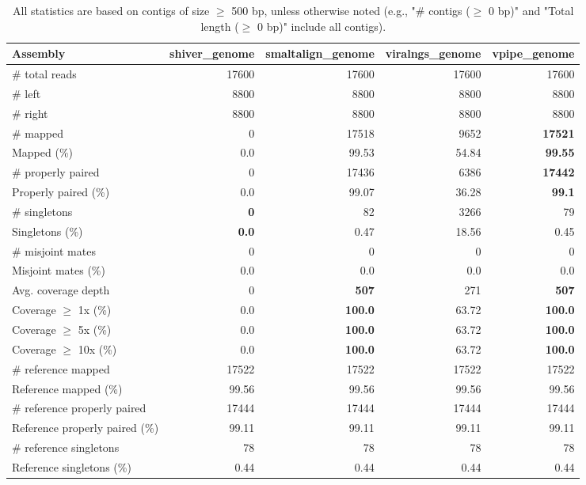 \documentclass[12pt,a4paper]{article}
\begin{document}
\begin{table}[ht]
\begin{center}
\caption{All statistics are based on contigs of size $\geq$ 500 bp, unless otherwise noted (e.g., "\# contigs ($\geq$ 0 bp)" and "Total length ($\geq$ 0 bp)" include all contigs).}
\begin{tabular}{|l*{4}{|r}|}
\hline
Assembly & shiver\_genome & smaltalign\_genome & viralngs\_genome & vpipe\_genome \\ \hline
\# total reads & 17600 & 17600 & 17600 & 17600 \\ \hline
\# left & 8800 & 8800 & 8800 & 8800 \\ \hline
\# right & 8800 & 8800 & 8800 & 8800 \\ \hline
\# mapped & 0 & 17518 & 9652 & {\bf 17521} \\ \hline
Mapped (\%) & 0.0 & 99.53 & 54.84 & {\bf 99.55} \\ \hline
\# properly paired & 0 & 17436 & 6386 & {\bf 17442} \\ \hline
Properly paired (\%) & 0.0 & 99.07 & 36.28 & {\bf 99.1} \\ \hline
\# singletons & {\bf 0} & 82 & 3266 & 79 \\ \hline
Singletons (\%) & {\bf 0.0} & 0.47 & 18.56 & 0.45 \\ \hline
\# misjoint mates & 0 & 0 & 0 & 0 \\ \hline
Misjoint mates (\%) & 0.0 & 0.0 & 0.0 & 0.0 \\ \hline
Avg. coverage depth & 0 & {\bf 507} & 271 & {\bf 507} \\ \hline
Coverage $\geq$ 1x (\%) & 0.0 & {\bf 100.0} & 63.72 & {\bf 100.0} \\ \hline
Coverage $\geq$ 5x (\%) & 0.0 & {\bf 100.0} & 63.72 & {\bf 100.0} \\ \hline
Coverage $\geq$ 10x (\%) & 0.0 & {\bf 100.0} & 63.72 & {\bf 100.0} \\ \hline
\# reference mapped & 17522 & 17522 & 17522 & 17522 \\ \hline
Reference mapped (\%) & 99.56 & 99.56 & 99.56 & 99.56 \\ \hline
\# reference properly paired & 17444 & 17444 & 17444 & 17444 \\ \hline
Reference properly paired (\%) & 99.11 & 99.11 & 99.11 & 99.11 \\ \hline
\# reference singletons & 78 & 78 & 78 & 78 \\ \hline
Reference singletons (\%) & 0.44 & 0.44 & 0.44 & 0.44 \\ \hline

\end{tabular}
\end{center}
\end{table}
\end{document}

